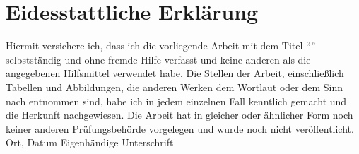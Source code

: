 \tocless\section{Eidesstattliche Erklärung}

Hiermit versichere ich, dass ich die vorliegende Arbeit mit dem Titel ``\atitle{}'' selbstständig und ohne fremde Hilfe verfasst und keine anderen als die angegebenen Hilfsmittel verwendet habe.
\newline
\newline
Die Stellen der Arbeit, einschließlich Tabellen und Abbildungen, die anderen Werken dem Wortlaut oder dem Sinn nach entnommen sind, habe ich in jedem einzelnen Fall kenntlich gemacht und die Herkunft nachgewiesen.
\newline
\newline
Die Arbeit hat in gleicher oder ähnlicher Form noch keiner anderen Prüfungsbehörde vorgelegen und wurde noch nicht veröffentlicht.
\vspace{3cm}
\newline
Ort, Datum
\vspace{2cm}
\newline
Eigenhändige Unterschrift